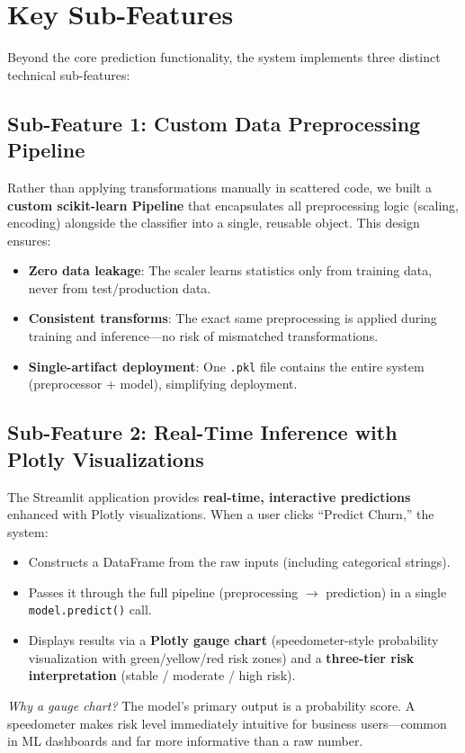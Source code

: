 \documentclass[12pt, a4paper]{article}
\begin{document}
\section{Key Sub-Features}

Beyond the core prediction functionality, the system implements three distinct technical sub-features:

\subsection{Sub-Feature 1: Custom Data Preprocessing Pipeline}

Rather than applying transformations manually in scattered code, we built a \textbf{custom scikit-learn Pipeline} that encapsulates all preprocessing logic (scaling, encoding) alongside the classifier into a single, reusable object. This design ensures:
\begin{itemize}
    \item \textbf{Zero data leakage}: The scaler learns statistics only from training data, never from test/production data.
    \item \textbf{Consistent transforms}: The exact same preprocessing is applied during training and inference---no risk of mismatched transformations.
    \item \textbf{Single-artifact deployment}: One \texttt{.pkl} file contains the entire system (preprocessor + model), simplifying deployment.
\end{itemize}

\subsection{Sub-Feature 2: Real-Time Inference with Plotly Visualizations}

The Streamlit application provides \textbf{real-time, interactive predictions} enhanced with Plotly visualizations. When a user clicks ``Predict Churn,'' the system:
\begin{itemize}
    \item Constructs a DataFrame from the raw inputs (including categorical strings).
    \item Passes it through the full pipeline (preprocessing $\rightarrow$ prediction) in a single \texttt{model.predict()} call.
    \item Displays results via a \textbf{Plotly gauge chart} (speedometer-style probability visualization with green/yellow/red risk zones) and a \textbf{three-tier risk interpretation} (stable / moderate / high risk).
\end{itemize}
\textit{Why a gauge chart?} The model's primary output is a probability score. A speedometer makes risk level immediately intuitive for business users---common in ML dashboards and far more informative than a raw number.
\end{document}
